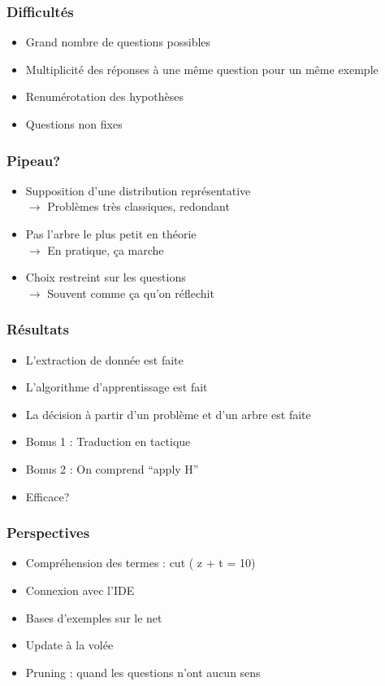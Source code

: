 \begin{frame}
  \frametitle{Difficultés}
  \begin{itemize}
  \item Grand nombre de questions possibles
  \item Multiplicité des réponses à une même question pour un même exemple
  \item Renumérotation des hypothèses
  \item Questions non fixes
  \end{itemize}
\end{frame}


\begin{frame}
  \frametitle{Pipeau?}
  \begin{itemize}
  \item Supposition d'une distribution représentative \\
    $\rightarrow$ Problèmes très classiques, redondant
  \item Pas l'arbre le plus petit en théorie \\
    $\rightarrow$ En pratique, ça marche
  \item Choix restreint sur les questions\\
    $\rightarrow$ Souvent comme ça qu'on réflechit
  \end{itemize}
\end{frame}


\begin{frame}
  \frametitle{Résultats}
  \begin{itemize}
  \item L'extraction de donnée est faite
  \item L'algorithme d'apprentissage est fait
  \item La décision à partir d'un problème et d'un arbre est faite
  \item Bonus 1 : Traduction en tactique
  \item Bonus 2 : On comprend ``apply H''
  \item Efficace?
\end{itemize}
\end{frame}

\begin{frame}
  \frametitle{Perspectives}
  
  \begin{itemize}
  \item Compréhension des termes : cut ( z + t = 10)
  \item Connexion avec l'IDE
  \item Bases d'exemples sur le net
  \item Update à la volée
  \item Pruning : quand les questions n'ont aucun sens
  \end{itemize}
\end{frame}
